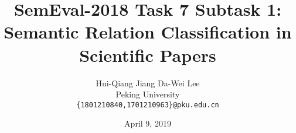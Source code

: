 \documentclass[12pt]{article}
\title{SemEval-2018 Task 7 Subtask 1: Semantic Relation Classification in Scientific Papers}
\author{Hui-Qiang Jiang \quad Da-Wei Lee \\
Peking University \\
{\tt \{1801210840,1701210963\}@pku.edu.cn}}
\date{April 9, 2019}
\begin{document}
\maketitle
\begin{abstract}
  
\end{abstract}

\begin{multicols}{2}







\end{multicols}







\end{document}
